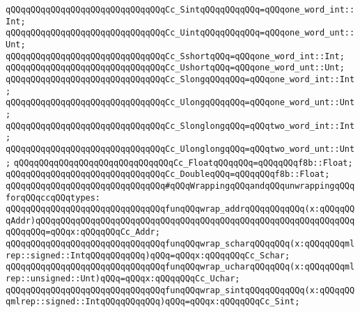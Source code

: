 \newline
\verb|qQQqqQQqqQQqqQQqqQQqqQQqqQQqqQQqCc_SintqQQqqQQqqQQq=qQQqone_word_int::Int;|\newline
\verb|qQQqqQQqqQQqqQQqqQQqqQQqqQQqqQQqCc_UintqQQqqQQqqQQq=qQQqone_word_unt::Unt;|\newline
\newline
\verb|qQQqqQQqqQQqqQQqqQQqqQQqqQQqqQQqCc_SshortqQQq=qQQqone_word_int::Int;|\newline
\verb|qQQqqQQqqQQqqQQqqQQqqQQqqQQqqQQqCc_UshortqQQq=qQQqone_word_unt::Unt;|\newline
\newline
\verb|qQQqqQQqqQQqqQQqqQQqqQQqqQQqqQQqCc_SlongqQQqqQQq=qQQqone_word_int::Int;|\newline
\verb|qQQqqQQqqQQqqQQqqQQqqQQqqQQqqQQqCc_UlongqQQqqQQq=qQQqone_word_unt::Unt;|\newline
\newline
\verb|qQQqqQQqqQQqqQQqqQQqqQQqqQQqqQQqCc_SlonglongqQQq=qQQqtwo_word_int::Int;|\newline
\verb|qQQqqQQqqQQqqQQqqQQqqQQqqQQqqQQqCc_UlonglongqQQq=qQQqtwo_word_unt::Unt;|\newline
\newline
\verb|qQQqqQQqqQQqqQQqqQQqqQQqqQQqqQQqCc_FloatqQQqqQQq=qQQqqQQqf8b::Float;|\newline
\verb|qQQqqQQqqQQqqQQqqQQqqQQqqQQqqQQqCc_DoubleqQQq=qQQqqQQqf8b::Float;|\newline
\newline
\newline
\newline
\verb|qQQqqQQqqQQqqQQqqQQqqQQqqQQqqQQq#qQQqWrappingqQQqandqQQqunwrappingqQQqforqQQqccqQQqtypes:|\newline
\newline
\verb|qQQqqQQqqQQqqQQqqQQqqQQqqQQqqQQqfunqQQqwrap_addrqQQqqQQqqQQq(x:qQQqqQQqAddr)qQQqqQQqqQQqqQQqqQQqqQQqqQQqqQQqqQQqqQQqqQQqqQQqqQQqqQQqqQQqqQQqqQQqqQQq=qQQqx:qQQqqQQqCc_Addr;|\newline
\newline
\verb|qQQqqQQqqQQqqQQqqQQqqQQqqQQqqQQqfunqQQqwrap_scharqQQqqQQq(x:qQQqqQQqmlrep::signed::IntqQQqqQQqqQQq)qQQq=qQQqx:qQQqqQQqCc_Schar;|\newline
\verb|qQQqqQQqqQQqqQQqqQQqqQQqqQQqqQQqfunqQQqwrap_ucharqQQqqQQq(x:qQQqqQQqmlrep::unsigned::Unt)qQQq=qQQqx:qQQqqQQqCc_Uchar;|\newline
\newline
\verb|qQQqqQQqqQQqqQQqqQQqqQQqqQQqqQQqfunqQQqwrap_sintqQQqqQQqqQQq(x:qQQqqQQqmlrep::signed::IntqQQqqQQqqQQq)qQQq=qQQqx:qQQqqQQqCc_Sint;|\newline
